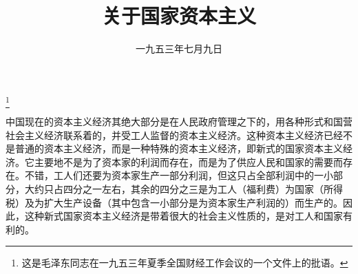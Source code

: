 
\title{关于国家资本主义}
\date{一九五三年七月九日}
\thanks{这是毛泽东同志在一九五三年夏季全国财经工作会议的一个文件上的批语。}
\maketitle


中国现在的资本主义经济其绝大部分是在人民政府管理之下的，用各种形式和国营社会主义经济联系着的，并受工人监督的资本主义经济。这种资本主义经济已经不是普通的资本主义经济，而是一种特殊的资本主义经济，即新式的国家资本主义经济。它主要地不是为了资本家的利润而存在，而是为了供应人民和国家的需要而存在。不错，工人们还要为资本家生产一部分利润，但这只占全部利润中的一小部分，大约只占四分之一左右，其余的四分之三是为工人（福利费）为国家（所得税）及为扩大生产设备（其中包含一小部分是为资本家生产利润的）而生产的。因此，这种新式国家资本主义经济是带着很大的社会主义性质的，是对工人和国家有利的。
